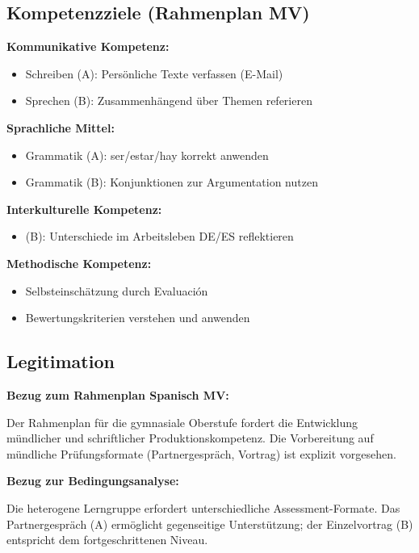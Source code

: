 \documentclass[11pt, a4paper]{article}
\begin{document}
\subsection{Kompetenzziele (Rahmenplan MV)}

\textbf{Kommunikative Kompetenz:}
\begin{itemize}[leftmargin=2em]
    \item Schreiben (A): Persönliche Texte verfassen (E-Mail)
    \item Sprechen (B): Zusammenhängend über Themen referieren
\end{itemize}

\textbf{Sprachliche Mittel:}
\begin{itemize}[leftmargin=2em]
    \item Grammatik (A): ser/estar/hay korrekt anwenden
    \item Grammatik (B): Konjunktionen zur Argumentation nutzen
\end{itemize}

\textbf{Interkulturelle Kompetenz:}
\begin{itemize}[leftmargin=2em]
    \item (B): Unterschiede im Arbeitsleben DE/ES reflektieren
\end{itemize}

\textbf{Methodische Kompetenz:}
\begin{itemize}[leftmargin=2em]
    \item Selbsteinschätzung durch Evaluación
    \item Bewertungskriterien verstehen und anwenden
\end{itemize}

\subsection{Legitimation}

\textbf{Bezug zum Rahmenplan Spanisch MV:}

Der Rahmenplan für die gymnasiale Oberstufe fordert die Entwicklung mündlicher und schriftlicher Produktionskompetenz. Die Vorbereitung auf mündliche Prüfungsformate (Partnergespräch, Vortrag) ist explizit vorgesehen.

\textbf{Bezug zur Bedingungsanalyse:}

Die heterogene Lerngruppe erfordert unterschiedliche Assessment-Formate. Das Partnergespräch (A) ermöglicht gegenseitige Unterstützung; der Einzelvortrag (B) entspricht dem fortgeschrittenen Niveau.
\end{document}
